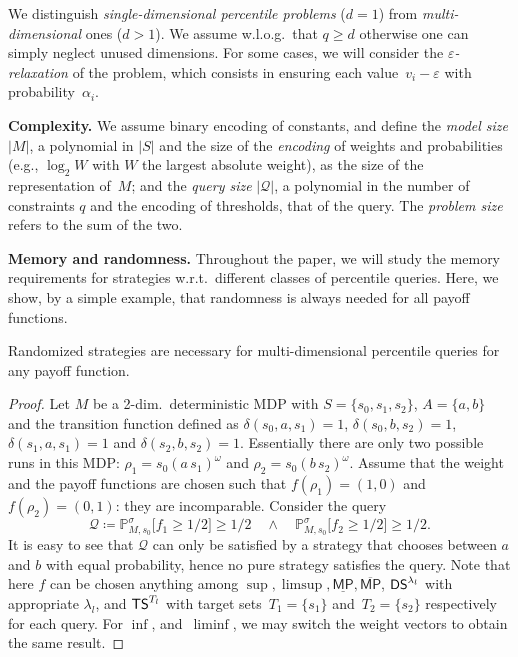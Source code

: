 \documentclass{llncs}
\newcommand{\states}{\ensuremath{S} }
\newcommand{\strat}{\ensuremath{\sigma} }
\newcommand*{\pr}{\mathbb{P}}
\newcommand*{\mpsup}{\ensuremath{\overline{\mathsf{MP}}}}
\newcommand*{\mpinf}{\ensuremath{\underline{\mathsf{MP}}}}
\newcommand{\truncatedSum}[1]{\ensuremath{{\sf TS}^{#1}} }
\newcommand{\discSum}[1]{\ensuremath{{\sf DS}^{#1}} }
\newcommand{\discount}{\ensuremath{\lambda} }
\newcommand{\dimension}{\ensuremath{d} }
\newcommand{\queries}{\ensuremath{q} }
\newcommand{\query}{\ensuremath{\mathcal{Q}} }
\begin{document}
We distinguish \textit{single-dimensional percentile problems} ($\dimension = 1$) from
\textit{multi-dimensional} ones ($\dimension > 1$).
We assume w.l.o.g.~that $\queries \geq \dimension$ otherwise one can simply neglect unused dimensions.
For some cases, we will consider the \emph{$\varepsilon$-relaxation} of the problem,
which consists in ensuring each value~$v_i-\varepsilon$ with probability~$\alpha_i$.


\smallskip\noindent\textbf{Complexity.} We assume binary encoding of constants,
and define the \emph{model size} $|M|$, a polynomial in $\vert \states \vert$ and the size of the \textit{encoding} of weights and probabilities (e.g., $\log_{2} W$ with $W$ the largest absolute weight), as the size of the representation of~$M$; and the \emph{query size} $|\query|$, a polynomial in the number of constraints $q$ and the encoding of thresholds, that of the query.
The \emph{problem size} refers to the sum of the two.

\smallskip\noindent\textbf{Memory and randomness.} 
Throughout the paper, we will study the memory requirements for strategies w.r.t.~different classes of percentile queries.
Here, we show, by a simple example, that randomness is always needed for all payoff functions.

\begin{lemma}
Randomized strategies are necessary for multi-dimensional percentile queries for any payoff function.
\end{lemma}

\begin{proof}
Let $M$ be a 2-dim.~deterministic MDP with $\states = \{s_{0}, s_{1}, s_{2}\}$, $A = \{a, b\}$ and the transition function defined as $\delta(s_0, a, s_1) = 1$, $\delta(s_0, b, s_2) = 1$, $\delta(s_1, a, s_1) = 1$ and $\delta(s_2, b, s_2) = 1$. Essentially there are only two possible runs in this MDP: $\rho_{1} = s_{0} (a\,s_{1})^{\omega}$ and $\rho_{2} = s_{0} (b\,s_{2})^{\omega}$. Assume that the weight and the payoff functions are chosen such that $f(\rho_{1}) = (1,0)$ and $f(\rho_{2}) = (0,1)$: they are incomparable. Consider the query \[\query \coloneqq \pr_{M,s_{0}}^\strat \big[f_{1} \geq 1/2\big] \geq 1/2\quad \wedge \quad \pr_{M,s_{0}}^\strat \big[f_{2} \geq 1/2\big] \geq 1/2.\] It is easy to see that $\query$ can only be satisfied by a strategy that chooses between $a$ and $b$ with equal probability, hence no pure strategy satisfies the query. 
Note that here $f$ can be chosen anything among $\sup,\limsup,\mpinf,\mpsup$, $\discSum{\discount_l}$ with appropriate $\discount_l$,
and $\truncatedSum{T_l}$ with target sets~$T_1=\{s_1\}$ and~$T_2=\{s_2\}$ respectively for each query. For $\inf$, and~$\liminf$, we may switch the weight vectors to obtain the same result.
\end{proof}
\end{document}
